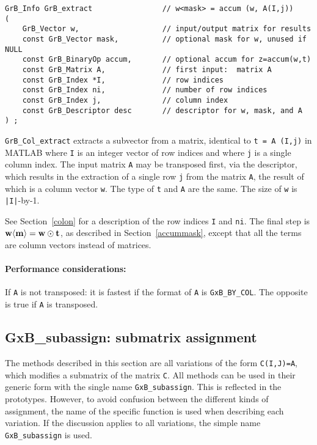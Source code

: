 \documentclass[12pt]{article}
\begin{document}
{\begin{mdframed}[userdefinedwidth=6in]
{\footnotesize
\begin{verbatim}
GrB_Info GrB_extract                // w<mask> = accum (w, A(I,j))
(
    GrB_Vector w,                   // input/output matrix for results
    const GrB_Vector mask,          // optional mask for w, unused if NULL
    const GrB_BinaryOp accum,       // optional accum for z=accum(w,t)
    const GrB_Matrix A,             // first input:  matrix A
    const GrB_Index *I,             // row indices
    const GrB_Index ni,             // number of row indices
    const GrB_Index j,              // column index
    const GrB_Descriptor desc       // descriptor for w, mask, and A
) ;
\end{verbatim} } \end{mdframed}

\verb'GrB_Col_extract' extracts a subvector from a matrix, identical to
\verb't = A (I,j)' in MATLAB where \verb'I' is an integer vector of row indices
and where \verb'j' is a single column index.  The input matrix \verb'A' may be
transposed first, via the descriptor, which results in the extraction of a
single row \verb'j' from the matrix \verb'A', the result of which is a column
vector \verb'w'.  The type of \verb't' and \verb'A' are the same.
The size of \verb'w' is \verb'|I|'-by-1.

See Section~\ref{colon} for a description of the row indices
\verb'I' and \verb'ni'.
The final step is ${\bf w \langle m
\rangle  = w \odot t}$, as described in Section~\ref{accummask}, except that
all the terms are column vectors instead of matrices.

\paragraph{\bf Performance considerations:} %
If \verb'A' is not transposed: it is fastest if the format of \verb'A' is
\verb'GxB_BY_COL'.  The opposite is true if \verb'A' is transposed.

\newpage
\subsection{{\sf GxB\_subassign:} submatrix assignment} %
\label{subassign}

The methods described in this section are all variations of the form
\verb'C(I,J)=A', which modifies a submatrix of the matrix \verb'C'.  All
methods can be used in their generic form with the single name
\verb'GxB_subassign'.  This is reflected in the prototypes.  However, to avoid
confusion between the different kinds of assignment, the name of the specific
function is used when describing each variation.  If the discussion applies to
all variations, the simple name \verb'GxB_subassign' is used.

}
\end{document}
